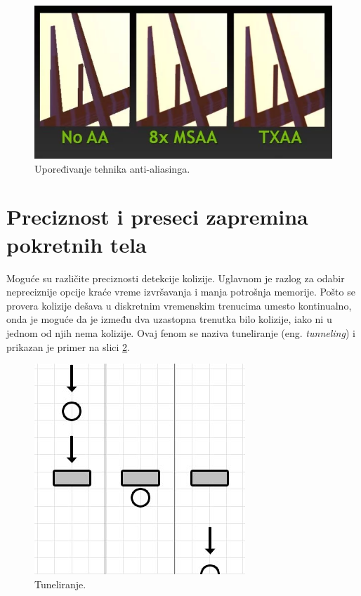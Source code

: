 \documentclass[12pt,oneside]{memoir}
\begin{document}
\begin{figure}[h!]
	\begin{center}
	\includegraphics[scale=0.65]{txaa.png}
	\end{center}
	\caption{Upoređivanje tehnika anti-aliasinga.}
	\label{fig:txaa}
\end{figure}

\section{Preciznost i preseci zapremina pokretnih tela}

Moguće su različite preciznosti detekcije kolizije. 
Uglavnom je razlog za odabir nepreciznije opcije kraće vreme izvršavanja i manja potrošnja memorije.
Pošto se provera kolizije dešava u diskretnim vremenskim trenucima umesto kontinualno, onda je moguće da 
je između dva uzastopna trenutka bilo kolizije, iako ni u jednom od njih nema kolizije. 
Ovaj fenom se naziva tuneliranje (eng. {\em tunneling}) i prikazan je primer na slici \ref{fig:tunnel}. 

\begin{figure}[h!]
	\begin{center}
	\includegraphics[scale=0.55]{tunnel.png}
	\end{center}
	\caption{Tuneliranje.}
	\label{fig:tunnel}
\end{figure}
\end{document}
